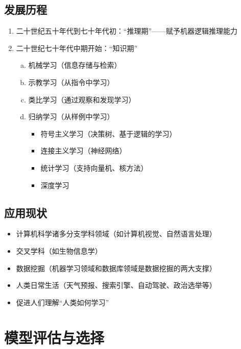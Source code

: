 \documentclass{ctexart}
\begin{document}
				\subsection{发展历程}
					\begin{enumerate}[1.]
						\item 二十世纪五十年代到七十年代初：``推理期''——赋予机器逻辑推理能力
						\item 二十世纪七十年代中期开始：``知识期''
							\begin{enumerate}[a.]
								\item 机械学习（信息存储与检索）
								\item 示教学习（从指令中学习）
								\item 类比学习（通过观察和发现学习）
								\item 归纳学习（从样例中学习）
									\begin{itemize}
										\item 符号主义学习（决策树、基于逻辑的学习）
										\item 连接主义学习（神经网络）
										\item 统计学习（支持向量机、核方法）
										\item 深度学习
									\end{itemize}
							\end{enumerate}
					\end{enumerate}
				\subsection{应用现状}
					\begin{itemize}
						\item 计算机科学诸多分支学科领域（如计算机视觉、自然语言处理）
						\item 交叉学科（如生物信息学）
						\item 数据挖掘（机器学习领域和数据库领域是数据挖掘的两大支撑）
						\item 人类日常生活（天气预报、搜索引擎、自动驾驶、政治选举等）
						\item 促进人们理解``人类如何学习''
					\end{itemize}
			\section{模型评估与选择}
\end{document}
